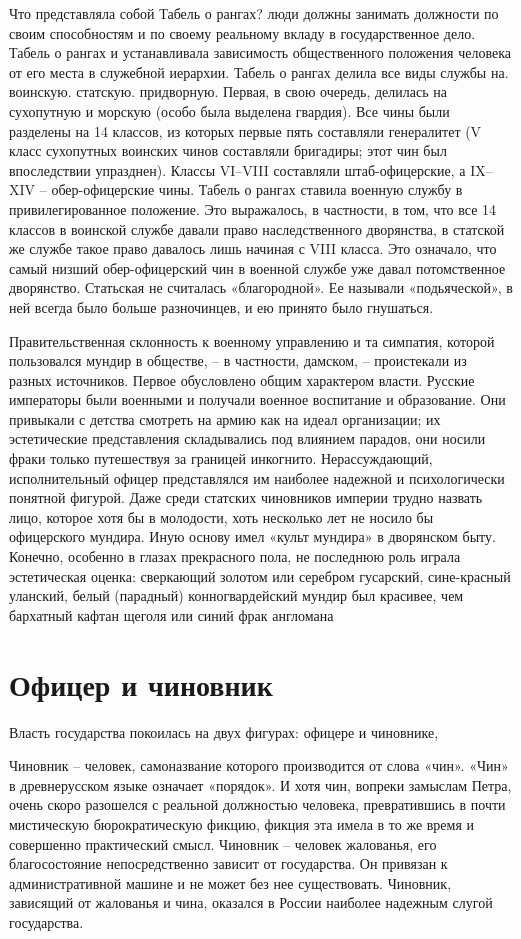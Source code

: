 \documentclass[12pt,a4paper]{article}
\begin{document}
Что представляла собой Табель о рангах?  
люди должны занимать должности по своим способностям
и по своему реальному вкладу в государственное дело.
Табель о рангах и устанавливала зависимость
общественного положения человека от его места
в служебной иерархии. 
Табель о рангах делила все виды службы на. 
воинскую. 
статскую. 
придворную.  
Первая, в свою очередь, делилась
на сухопутную и морскую (особо была выделена гвардия).
Все чины были разделены на 14 классов, из которых первые
пять составляли генералитет (V  класс сухопутных воинских
чинов составляли бригадиры; этот чин был впоследствии
упразднен). Классы VI–VIII составляли штаб-офицерские,
а IX–XIV – обер-офицерские чины.
Табель о рангах ставила военную службу
в привилегированное положение. Это выражалось,
в частности, в том, что все 14 классов в воинской службе
давали право наследственного дворянства, в статской же
службе такое право давалось лишь начиная с VIII класса. Это
означало, что самый низший обер-офицерский чин
в военной службе уже давал потомственное дворянство.  
Статьская не считалась «благородной».
Ее называли «подьяческой», в ней всегда было больше
разночинцев, и ею принято было гнушаться.

Правительственная склонность к военному
управлению и та симпатия, которой пользовался мундир
в обществе, – в частности, дамском, – проистекали из разных
источников. Первое обусловлено общим характером власти.
Русские императоры были военными и получали военное
воспитание и образование. Они привыкали с детства
смотреть на армию как на идеал организации; их
эстетические представления складывались под влиянием
парадов, они носили фраки только путешествуя за границей
инкогнито. Нерассуждающий, исполнительный офицер
представлялся им наиболее надежной и психологически
понятной фигурой. Даже среди статских чиновников
империи трудно назвать лицо, которое хотя бы в молодости,
хоть несколько лет не носило бы офицерского мундира.
Иную основу имел «культ мундира» в дворянском быту.
Конечно, особенно в глазах прекрасного пола, не
последнюю роль играла эстетическая оценка: 
сверкающий золотом или серебром гусарский, сине-красный
уланский, белый (парадный) конногвардейский мундир был
красивее, чем бархатный кафтан щеголя или синий фрак
англомана
\section{Офицер и чиновник}
Власть государства покоилась на двух фигурах: офицере
и чиновнике,

Чиновник – человек, самоназвание которого производится от слова «чин». «Чин» в древнерусском языке означает «порядок». И хотя чин,
вопреки замыслам Петра, очень скоро разошелся
с реальной должностью человека, превратившись в почти
мистическую бюрократическую фикцию, фикция эта имела
в то же время и совершенно практический смысл.
Чиновник – человек жалованья, его благосостояние
непосредственно зависит от государства. Он привязан
к административной машине и не может без нее
существовать. Чиновник, зависящий от жалованья и чина,
оказался в России наиболее надежным слугой государства.
\end{document}
